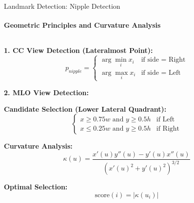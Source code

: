 \documentclass[8pt,aspectratio=169,xcolor=dvipsnames]{beamer}
\begin{document}
\begin{frame}{Landmark Detection: Nipple Detection}
    \framesubtitle{Geometric Principles and Curvature Analysis}
    
    \begin{columns}
        \begin{column}{0.55\textwidth}
            \footnotesize
            \textbf{1. CC View Detection (Lateralmost Point):}
            \begin{equation}
            p_{nipple} = \begin{cases}
               \arg\min_i x_i & \text{if side = Right} \\
                \arg\max_i x_i & \text{if side = Left}
            \end{cases}
            \end{equation}
            
            \vspace{0.2cm}
            
            \textbf{2. MLO View Detection:}
            
            \textbf{Candidate Selection (Lower Lateral Quadrant):}
            \begin{equation}
            \begin{cases}
                x \geq 0.75w \text{ and } y \geq 0.5h & \text{if Left} \\
                x \leq 0.25w \text{ and } y \geq 0.5h & \text{if Right}
            \end{cases}
            \end{equation}
            
            \textbf{Curvature Analysis:}
            \begin{equation}
            \kappa(u) = \frac{x'(u)y''(u) - y'(u)x''(u)}{(x'(u)^2 + y'(u)^2)^{3/2}}
            \end{equation}
            
            \textbf{Optimal Selection:}
            \begin{equation}
            \text{score}(i) = |\kappa(u_i)|
            \end{equation}
        \end{column}
        

\end{columns}
\end{frame}
\end{document}
